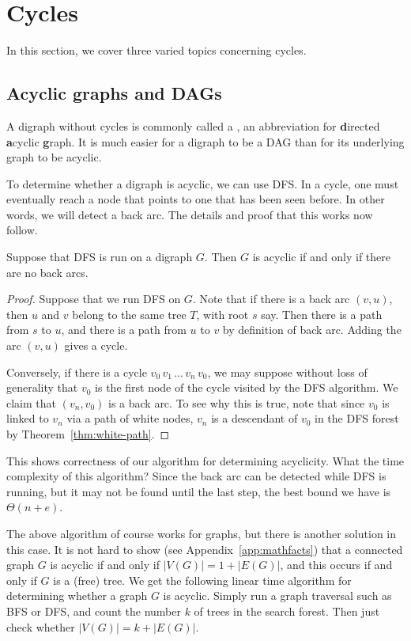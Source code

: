 \section{Cycles}
\label{sec:cycles}

In this section, we cover three varied topics concerning cycles.

\subsection{Acyclic graphs and DAGs}
\label{subsec:dag}

A digraph without cycles is commonly called a , an
abbreviation for \textbf{d}irected \textbf{a}cyclic
\textbf{g}raph. It is much easier for a digraph to be a
DAG than for its underlying graph to be acyclic. 

To determine whether a digraph is acyclic, we can use DFS.  In a cycle, 
one must eventually reach a node that points to one that has been seen
before. In other words, we will detect a back arc. The details and proof
that this works now follow.

\begin{Theorem}
\label{thm:DAG}
Suppose that DFS is run on a digraph $G$. Then $G$ is acyclic if and
only if there are no back arcs.
\end{Theorem}

\begin{proof}
Suppose that we run DFS on $G$. Note that if there is a
back arc $(v, u)$, then $u$ and $v$ belong to the same tree $T$, with
root $s$ say. Then there is a path from $s$ to $u$, and there is a path
from $u$ to $v$ by definition of back arc. Adding the arc $(v, u)$ gives
a cycle. 

Conversely, if there is a cycle $v_0\, v_1\, \dots \, v_n\, v_0$, we may
suppose without loss of generality that $v_0$ is the first node of the
cycle  visited by the DFS algorithm. We claim that $(v_n, v_0)$ is a
back arc. To see why this is true, note that since $v_0$ is linked to
$v_n$ via a path of white nodes, $v_n$ is a descendant of $v_0$ in the
DFS forest by Theorem~\ref{thm:white-path}. 
\end{proof}

This shows correctness of our algorithm for determining acyclicity. What
the time complexity of this algorithm?  Since the back arc can be
detected while DFS is running, but it may not be found until the last
step, the best bound we have is $\Theta(n+e)$. 

The above algorithm of course works for graphs, but there
is another solution in this case. It is not hard to show (see
Appendix~\ref{app:mathfacts}) that a connected graph $G$ is acyclic if and
only if $|V(G)| = 1 + |E(G)|$, and this occurs if and only if $G$ is a
(free) tree. We get the following linear time algorithm for determining
whether a graph $G$ is acyclic. Simply run a graph traversal such as
BFS or DFS, and count the number $k$ of trees in the search forest. Then
just check whether $|V(G)| = k + |E(G)|$.

